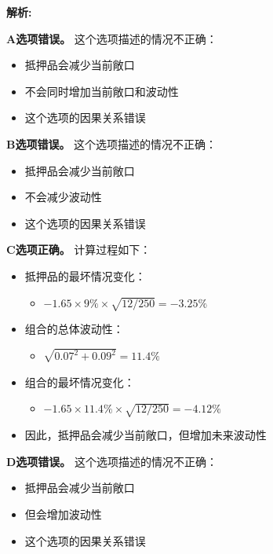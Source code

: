 \documentclass{article}
\newenvironment{explanation}
{\textbf{解析:}\par}
{\par}
\begin{document}
\begin{explanation}
    \textbf{A选项错误。}
    这个选项描述的情况不正确：
    \begin{itemize}
        \item 抵押品会减少当前敞口
        \item 不会同时增加当前敞口和波动性
        \item 这个选项的因果关系错误
    \end{itemize}

    \textbf{B选项错误。}
    这个选项描述的情况不正确：
    \begin{itemize}
        \item 抵押品会减少当前敞口
        \item 不会减少波动性
        \item 这个选项的因果关系错误
    \end{itemize}

    \textbf{C选项正确。}
    计算过程如下：
    \begin{itemize}
        \item 抵押品的最坏情况变化：
        \begin{itemize}
            \item $-1.65 \times 9\% \times \sqrt{12/250} = -3.25\%$
        \end{itemize}
        \item 组合的总体波动性：
        \begin{itemize}
            \item $\sqrt{0.07^2 + 0.09^2} = 11.4\%$
        \end{itemize}
        \item 组合的最坏情况变化：
        \begin{itemize}
            \item $-1.65 \times 11.4\% \times \sqrt{12/250} = -4.12\%$
        \end{itemize}
        \item 因此，抵押品会减少当前敞口，但增加未来波动性
    \end{itemize}

    \textbf{D选项错误。}
    这个选项描述的情况不正确：
    \begin{itemize}
        \item 抵押品会减少当前敞口
        \item 但会增加波动性
        \item 这个选项的因果关系错误
    \end{itemize}
\end{explanation}
\end{document}
